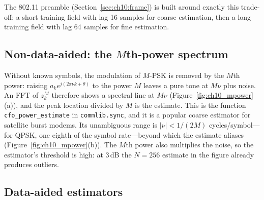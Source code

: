 The 802.11 preamble (Section~\ref{sec:ch10:frame}) is built around exactly this trade-off: a short
training field with lag 16 samples for coarse estimation, then a long training field with lag 64
samples for fine estimation.

\subsection{Non-data-aided: the \texorpdfstring{$M$}{M}th-power spectrum}

Without known symbols, the modulation of $M$-PSK is removed by the $M$th power: raising
$a_ke^{j(2\pi\nu k+\theta)}$ to the power $M$ leaves a pure tone at $M\nu$ plus noise. An FFT of
$z_k^M$ therefore shows a spectral line at $M\nu$ (Figure~\ref{fig:ch10_mpower}(a)), and the peak
location divided by $M$ is the estimate. This is the function \texttt{cfo\_power\_estimate} in
\texttt{commlib.sync}, and it is a popular coarse estimator for satellite burst modems. Its
unambiguous range is $|\nu|<1/(2M)$ cycles/symbol---for QPSK, one eighth of the symbol rate---beyond
which the estimate aliases (Figure~\ref{fig:ch10_mpower}(b)). The $M$th power also multiplies the
noise, so the estimator's threshold is high: at 3\,dB the $N=256$ estimate in the figure already
produces outliers.


\subsection{Data-aided estimators}

